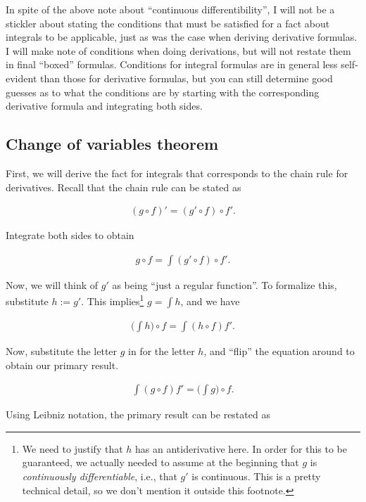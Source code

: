 \documentclass{article}
\begin{document}
In spite of the above note about ``continuous differentibility'', I will not be a stickler about stating the conditions that must be satisfied for a fact about integrals to be applicable, just as was the case when deriving derivative formulas. I will make note of conditions when doing derivations, but will not restate them in final ``boxed'' formulas. Conditions for integral formulas are in general less self-evident than those for derivative formulas, but you can still determine good guesses as to what the conditions are by starting with the corresponding derivative formula and integrating both sides.

\subsection*{Change of variables theorem}

First, we will derive the fact for integrals that corresponds to the chain rule for derivatives. Recall that the chain rule can be stated as

\begin{align*}
    (g \circ f)' = (g' \circ f) \circ f'.
\end{align*}

Integrate both sides to obtain

\begin{align*}
    g \circ f = \int (g' \circ f) \circ f'.
\end{align*}

Now, we will think of $g'$ as being ``just a regular function''. To formalize this, substitute $h := g'$. This implies\footnote{We need to justify that $h$ has an antiderivative here. In order for this to be guaranteed, we actually needed to assume at the beginning that $g$ is \textit{continuously differentiable}, i.e., that $g'$ is continuous. This is a pretty technical detail, so we don't mention it outside this footnote.} $g = \int h$, and we have

\begin{align*}
    \Big( \int h \Big) \circ f = \int (h \circ f) f'.
\end{align*}

Now, substitute the letter $g$ in for the letter $h$, and ``flip'' the equation around to obtain our primary result.

\begin{align*}
    \int (g \circ f) f' = \Big(\int g \Big) \circ f.
\end{align*}

Using Leibniz notation, the primary result can be restated as
        
\end{document}
